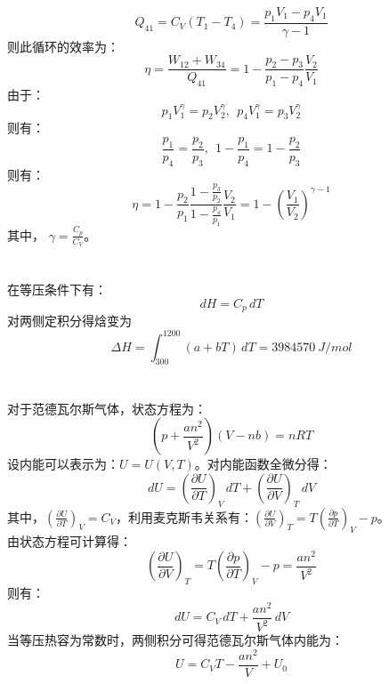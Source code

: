 \documentclass[a4paper,12pt]{article}
\begin{document}
\begin{equation}\nonumber
	Q_{41}=C_V(T_1-T_4)=\frac{p_1V_1-p_4V_1}{\gamma-1}
\end{equation}
则此循环的效率为：
\begin{equation}\nonumber
	\eta=\frac{W_{12}+W_{34}}{Q_{41}}=1-\frac{p_2-p_3}{p_1-p_4}\frac{V_2}{V_1}
\end{equation}
由于：
\begin{equation}\nonumber
	p_1V_1^{\gamma}=p_2V_2^{\gamma},~~p_4V_1^{\gamma}=p_3V_2^{\gamma}
\end{equation}
则有：
\begin{equation}\nonumber
	\frac{p_1}{p_4}=\frac{p_2}{p_3},~~1-\frac{p_1}{p_4}=1-\frac{p_2}{p_3}
\end{equation}
则有：
\begin{equation}\nonumber
	\eta=1-\frac{p_2}{p_1}\frac{1-\frac{p_3}{p_2}}{1-\frac{p_4}{p_1}}\frac{V_2}{V_1}=1-\left(\frac{V_1}{V_2}\right)^{\gamma-1}
\end{equation}
其中， $\gamma=\frac{C_p}{C_V}$。


\section{}
在等压条件下有：
\begin{equation}\nonumber
	dH=C_p\,dT
\end{equation}
对两侧定积分得焓变为
\begin{equation}\nonumber
	\Delta H=\int_{300}^{1200} (a+bT)\,dT=3984570 ~J/mol
\end{equation}

\section{}
对于范德瓦尔斯气体，状态方程为：
\begin{equation}\nonumber
	\left(p+\frac{an^2}{V^2}\right)\left(V-nb\right)=nRT
\end{equation}
设内能可以表示为：$U=U(V,T)$。对内能函数全微分得：
\begin{equation}\nonumber
	dU=\left(\frac{\partial U}{\partial T}\right)_{V}\,dT+\left(\frac{\partial U}{\partial V}\right)_{T}\,dV
\end{equation}
其中，$\left(\frac{\partial U}{\partial T}\right)_{V}=C_V$，利用麦克斯韦关系有：$\left(\frac{\partial U}{\partial V}\right)_{T}=T\left(\frac{\partial p}{\partial T}\right)_V-p$。\\
由状态方程可计算得：
\begin{equation}\nonumber
	\left(\frac{\partial U}{\partial V}\right)_{T}=T\left(\frac{\partial p}{\partial T}\right)_V-p=\frac{an^2}{V^2}
\end{equation}
则有：
\begin{equation}\nonumber
	dU=C_V\,dT+\frac{an^2}{V^2}\,dV
\end{equation}
当等压热容为常数时，两侧积分可得范德瓦尔斯气体内能为：
\begin{equation}\nonumber
	U=C_VT-\frac{an^2}{V}+U_0
\end{equation}
\end{document}
